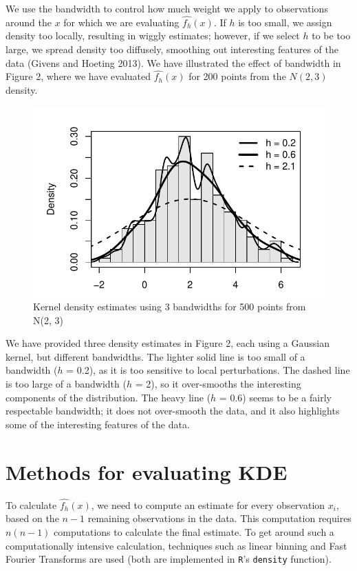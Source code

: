 \documentclass[]{article}
\begin{document}
We use the bandwidth to control how much weight we apply to observations
around the \(x\) for which we are evaluating \(\widehat{f_h}(x)\). If
\(h\) is too small, we assign density too locally, resulting in wiggly
estimates; however, if we select \(h\) to be too large, we spread
density too diffusely, smoothing out interesting features of the data
(Givens and Hoeting 2013). We have illustrated the effect of bandwidth
in Figure 2, where we have evaluated \(\widehat{f_h}(x)\) for 200 points
from the \(N(2, 3)\) density.

\begin{figure}[htbp]
\centering
\includegraphics{FinalReport_files/figure-latex/unnamed-chunk-3-1.pdf}
\caption{Kernel density estimates using 3 bandwidths for 500 points from
N(2, 3)}
\end{figure}

We have provided three density estimates in Figure 2, each using a
Gaussian kernel, but different bandwidths. The lighter solid line is too
small of a bandwidth (\(h\) = 0.2), as it is too sensitive to local
perturbations. The dashed line is too large of a bandwidth (\(h\) = 2),
so it over-smooths the interesting components of the distribution. The
heavy line (\(h\) = 0.6) seems to be a fairly respectable bandwidth; it
does not over-smooth the data, and it also highlights some of the
interesting features of the data.

\newpage

\section{Methods for evaluating KDE}\label{methods-for-evaluating-kde}

To calculate \(\widehat{f_h}(x)\), we need to compute an estimate for
every observation \(x_i\), based on the \(n-1\) remaining observations
in the data. This computation requires \(n (n-1)\) computations to
calculate the final estimate. To get around such a computationally
intensive calculation, techniques such as linear binning and Fast
Fourier Transforms are used (both are implemented in \texttt{R}'s
\texttt{density} function).
\end{document}
